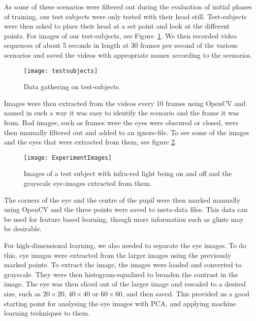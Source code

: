 As some of these scenarios were filtered out during the evaluation of initial phases of training, our test subjects
were only tested with their head still.
Test-subjects were then asked to place their head at a set point and look at the different points. For images of our test-subjects, see Figure~\ref{fig:testsubjects}. %
We then recorded video sequences of about 5 seconds in length at 30 frames per second of the various scenarios and saved the videos with appropriate names according to the scenarios.

\begin{figure}[h!]
\centering
\texttt{[image: testsubjects]}
\caption{Data gathering on test-subjects.}
\label{fig:testsubjects}
\end{figure}

Images were then extracted from the videos every 10 frames using OpenCV and named in such a way it was easy to identify the scenario and the frame it was from.
Bad images, such as frames were the eyes were obscured or closed, were then manually filtered out and added to an ignore-file.
To see some of the images and the eyes that were extracted from them, see figure \ref{fig:experimentimage}.

\begin{figure}[h!]
\centering
\texttt{[image: ExperimentImages]}
\caption{Images of a test subject with infra-red light being on and off and the grayscale eye-images extracted from them.}
\label{fig:experimentimage}
\end{figure}

The corners of the eye and the centre of the pupil were then marked manually using OpenCV and the three points were saved to meta-data files.
This data can be used for feature based learning, though more information such as glints may be desirable.

For high-dimensional learning, we also needed to separate the eye images.
To do this, eye images were extracted from the larger images using the previously marked points.
To extract the image, the images were loaded and converted to grayscale.
They were then histogram-equalized to broaden the contrast in the image. %
The eye was then sliced out of the larger image and rescaled to a desired size, such as $20\times 20$, $40\times 40$ or $60\times 60$, and then saved.
This provided us a good starting point for analysing the eye images with PCA, and applying machine learning techniques to them.
